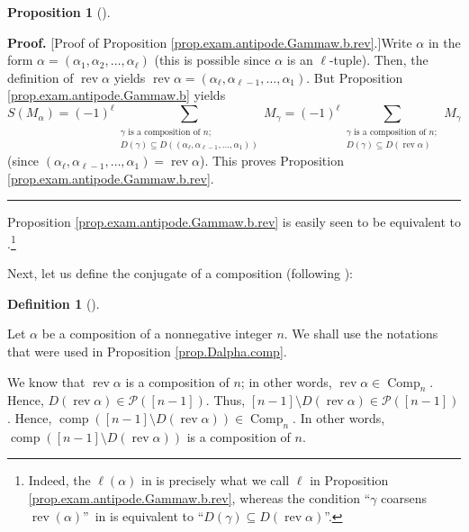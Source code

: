 \documentclass[numbers=enddot,12pt,final,onecolumn,notitlepage,abstracton]{scrartcl}
\theoremstyle{definition}
\newtheorem{prop}[theo]{Proposition}
\newenvironment{proposition}[1][]
{\begin{prop}[#1]\begin{leftbar}}
{\end{leftbar}\end{prop}}
\newtheorem{defi}[theo]{Definition}
\newenvironment{definition}[1][]
{\begin{defi}[#1]\begin{leftbar}}
{\end{leftbar}\end{defi}}
\newenvironment{proof}[1][Proof]{\noindent\textbf{#1.} }{\ \rule{0.5em}{0.5em}}
\let\sumnonlimits\sum
\renewcommand{\sum}{\sumnonlimits\limits}
\newenvironment{verlong}{}{}
\begin{document}
\begin{verlong}
\begin{footnotesize}
\begin{proposition}
\end{proposition}

\begin{proof}
[Proof of Proposition \ref{prop.exam.antipode.Gammaw.b.rev}.]Write $\alpha$ in
the form $\alpha=\left(  \alpha_{1},\alpha_{2},\ldots,\alpha_{\ell}\right)  $
(this is possible since $\alpha$ is an $\ell$-tuple). Then, the definition of
$\operatorname*{rev}\alpha$ yields $\operatorname*{rev}\alpha=\left(
\alpha_{\ell},\alpha_{\ell-1},\ldots,\alpha_{1}\right)  $. But Proposition
\ref{prop.exam.antipode.Gammaw.b} yields%
\[
S\left(  M_{\alpha}\right)  =\left(  -1\right)  ^{\ell}\sum_{\substack{\gamma
\text{ is a composition of }n;\\D\left(  \gamma\right)  \subseteq D\left(
\left(  \alpha_{\ell},\alpha_{\ell-1},\ldots,\alpha_{1}\right)  \right)
}}M_{\gamma}=\left(  -1\right)  ^{\ell}\sum_{\substack{\gamma\text{ is a
composition of }n;\\D\left(  \gamma\right)  \subseteq D\left(
\operatorname*{rev}\alpha\right)  }}M_{\gamma}%
\]
(since $\left(  \alpha_{\ell},\alpha_{\ell-1},\ldots,\alpha_{1}\right)
=\operatorname*{rev}\alpha$). This proves Proposition
\ref{prop.exam.antipode.Gammaw.b.rev}.
\end{proof}

Proposition \ref{prop.exam.antipode.Gammaw.b.rev} is easily seen to be
equivalent to \cite[Theorem 5.1.11]{Reiner}.\footnote{Indeed, the $\ell\left(
\alpha\right)  $ in \cite[Theorem 5.1.11]{Reiner} is precisely what we call
$\ell$ in Proposition \ref{prop.exam.antipode.Gammaw.b.rev}, whereas the
condition \textquotedblleft$\gamma$ coarsens $\operatorname*{rev}\left(
\alpha\right)  $\textquotedblright\ in \cite[Theorem 5.1.11]{Reiner} is
equivalent to \textquotedblleft$D\left(  \gamma\right)  \subseteq D\left(
\operatorname*{rev}\alpha\right)  $\textquotedblright.}

Next, let us define the conjugate of a composition (following \cite[Definition
5.2.14]{Reiner}):

\begin{definition}
\label{def.conjugate}Let $\alpha$ be a composition of a nonnegative integer
$n$. We shall use the notations that were used in Proposition
\ref{prop.Dalpha.comp}.

We know that $\operatorname*{rev}\alpha$ is a composition of $n$; in other
words, $\operatorname*{rev}\alpha\in\operatorname*{Comp}\nolimits_{n}$. Hence,
$D\left(  \operatorname*{rev}\alpha\right)  \in\mathcal{P}\left(  \left[
n-1\right]  \right)  $. Thus, $\left[  n-1\right]  \setminus D\left(
\operatorname*{rev}\alpha\right)  \in\mathcal{P}\left(  \left[  n-1\right]
\right)  $. Hence, $\operatorname*{comp}\left(  \left[  n-1\right]  \setminus
D\left(  \operatorname*{rev}\alpha\right)  \right)  \in\operatorname*{Comp}%
\nolimits_{n}$. In other words, $\operatorname*{comp}\left(  \left[
n-1\right]  \setminus D\left(  \operatorname*{rev}\alpha\right)  \right)  $ is
a composition of $n$.


\end{definition}
\end{footnotesize}
\end{verlong}
\end{document}
